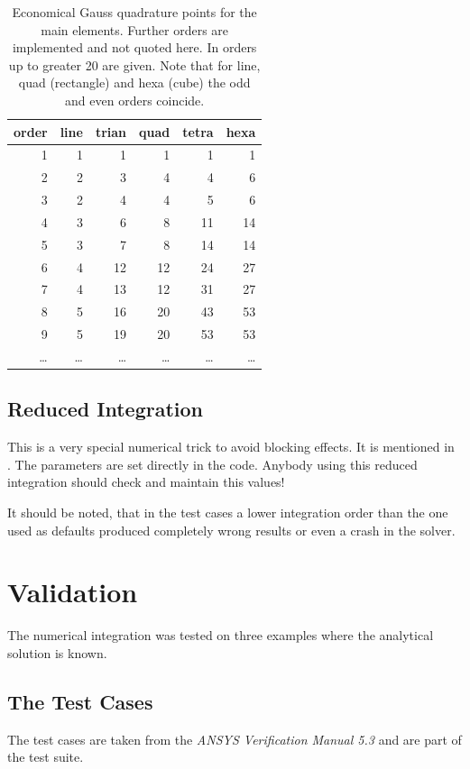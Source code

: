 \documentclass[a4paper,10pt]{article}
\begin{document}
\begin{table}
\begin{center}
\begin{tabular}{r|r|r|r|r|r}
order & line & trian & quad & tetra & hexa \\
\hline
1     & 1    & 1     & 1    & 1     & 1    \\ 
2     & 2    & 3     & 4    & 4     & 6    \\
3     & 2    & 4     & 4    & 5     & 6    \\
4     & 3    & 6     & 8    & 11    & 14   \\
5     & 3    & 7     & 8    & 14    & 14   \\
6     & 4    & 12    & 12   & 24    & 27   \\
7     & 4    & 13    & 12   & 31    & 27   \\
8     & 5    & 16    & 20   & 43    & 53   \\
9     & 5    & 19    & 20   & 53    & 53   \\
\ldots & \ldots & \ldots & \ldots & \ldots & \ldots \\
\end{tabular}
\caption{Economical Gauss quadrature points for the main elements. Further orders are implemented and not quoted here. In \cite{Solin04} orders up to greater 20 are given. Note that for line, quad (rectangle) and hexa (cube) the odd and even orders coincide.}
\label{tab:order_points}
\end{center}
\end{table}

\subsection{Reduced Integration}
This is a very special numerical trick to avoid blocking effects. It is mentioned in \cite{Hughes00}. The parameters are set directly in the code. Anybody using this reduced integration should check and maintain this values!

It should be noted, that in the test cases a lower integration order than the one used as defaults produced completely wrong results or even a crash in the solver.

\section{Validation}
The numerical integration was tested on three examples where the analytical solution is known. 
\subsection{The Test Cases}
\label{sec:test_cases}
The test cases are taken from the \textit{ANSYS Verification Manual 5.3} and are part of the test suite. 
\end{document}
